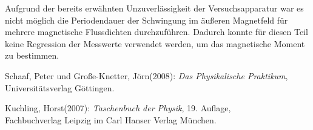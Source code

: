     Aufgrund der bereits erwähnten Unzuverlässigkeit der Versuchsapparatur war es nicht möglich die Periodendauer der
    Schwingung im äußeren Magnetfeld für mehrere magnetische Flussdichten durchzuführen. Dadurch konnte für diesen
    Teil keine Regression der Messwerte verwendet werden, um das magnetische Moment zu bestimmen.
  
  \newpage
  \begin{thebibliography}{9}


     Schaaf, Peter und Große-Knetter, Jörn(2008): \emph{Das Physikalische Praktikum},\\
                       Universitätsverlag Göttingen.

     Kuchling, Horst(2007): \emph{Taschenbuch der Physik},
                       19. Auflage,\\ Fachbuchverlag Leipzig im Carl Hanser Verlag München.


  \end{thebibliography}

 


